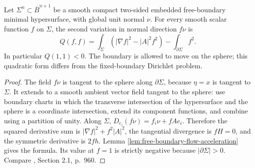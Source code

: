 \begin{proposition}\label{prop:free-boundary-normal-form}
Let $\Sigma^n\subset\overline B^{n+1}$ be a smooth compact two-sided embedded free-boundary minimal hypersurface, with global unit normal $\nu$. For every smooth scalar function $f$ on $\Sigma$, the second variation in normal direction $f\nu$ is
\[
 Q(f,f)=\int_\Sigma(|\nabla f|^2-|A|^2f^2)-\int_{\partial\Sigma}f^2.
\]
In particular $Q(1,1)<0$. The boundary is allowed to move on the sphere; this quadratic form differs from the fixed-boundary Dirichlet problem.
\end{proposition}
\begin{proof}
The field $f\nu$ is tangent to the sphere along $\partial\Sigma$, because $\eta=x$ is tangent to $\Sigma$. It extends to a smooth ambient vector field tangent to the sphere: use boundary charts in which the transverse intersection of the hypersurface and the sphere is a coordinate intersection, extend its component functions, and combine using a partition of unity. Along $\Sigma$, $D_{e_i}(f\nu)=f_i\nu+fAe_i$. Therefore the squared derivative sum is $|\nabla f|^2+f^2|A|^2$, the tangential divergence is $fH=0$, and the symmetric derivative is $2fh$. Lemma \ref{lem:free-boundary-flow-acceleration} gives the formula. Its value at $f=1$ is strictly negative because $|\partial\Sigma|>0$. Compare \cite{Fraser00}, Section 2.1, p.~960.
\end{proof}

